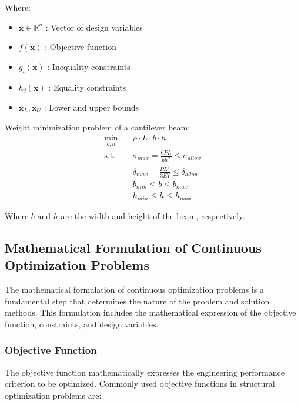 Where:
\begin{itemize}
    \item $\mathbf{x} \in \mathbb{R}^n$ : Vector of design variables
    \item $f(\mathbf{x})$ : Objective function
    \item $g_i(\mathbf{x})$ : Inequality constraints
    \item $h_j(\mathbf{x})$ : Equality constraints
    \item $\mathbf{x}_L, \mathbf{x}_U$ : Lower and upper bounds
\end{itemize}

\begin{tcolorbox}[title=Continuous Optimization Example]
Weight minimization problem of a cantilever beam:
\begin{align}
\min_{b,h} \quad & \rho \cdot L \cdot b \cdot h \\
\text{s.t.} \quad & \sigma_{max} = \frac{6PL}{bh^2} \leq \sigma_{allow} \\
& \delta_{max} = \frac{PL^3}{3EI} \leq \delta_{allow} \\
& b_{min} \leq b \leq b_{max} \\
& h_{min} \leq h \leq h_{max}
\end{align}

Where $b$ and $h$ are the width and height of the beam, respectively.
\end{tcolorbox}


\subsection{Mathematical Formulation of Continuous Optimization Problems}

The mathematical formulation of continuous optimization problems is a fundamental step that determines the nature of the problem and solution methods. This formulation includes the mathematical expression of the objective function, constraints, and design variables.

\subsubsection{Objective Function}
The objective function mathematically expresses the engineering performance criterion to be optimized. Commonly used objective functions in structural optimization problems are:

